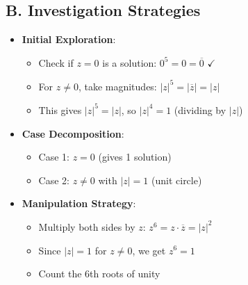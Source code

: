 \documentclass[11pt]{article}
\begin{document}
\begin{strategybox}
\subsection*{B. Investigation Strategies}
\begin{itemize}[leftmargin=*]
    \item \textbf{Initial Exploration}:
    \begin{itemize}
        \item Check if $z = 0$ is a solution: $0^5 = 0 = \overline{0}$ $\checkmark$
        \item For $z \neq 0$, take magnitudes: $|z|^5 = |\overline{z}| = |z|$
        \item This gives $|z|^5 = |z|$, so $|z|^4 = 1$ (dividing by $|z|$)
    \end{itemize}
    \item \textbf{Case Decomposition}:
    \begin{itemize}
        \item Case 1: $z = 0$ (gives 1 solution)
        \item Case 2: $z \neq 0$ with $|z| = 1$ (unit circle)
    \end{itemize}
    \item \textbf{Manipulation Strategy}:
    \begin{itemize}
        \item Multiply both sides by $z$: $z^6 = z \cdot \overline{z} = |z|^2$
        \item Since $|z| = 1$ for $z \neq 0$, we get $z^6 = 1$
        \item Count the 6th roots of unity
    \end{itemize}
\end{itemize}


\end{strategybox}
\end{document}
